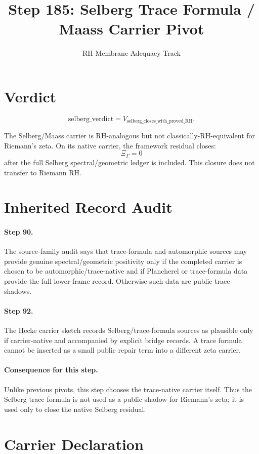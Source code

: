 \documentclass[11pt]{article}
\title{Step 185: Selberg Trace Formula / Maass Carrier Pivot}
\author{RH Membrane Adequacy Track}
\date{}
\newcommand{\XiGamma}{\Xi_{\Gamma}}
\begin{document}
\maketitle

\section*{Verdict}

\[
\boxed{\mathrm{selberg\_verdict}=V_{\mathrm{selberg\_closes\_with\_proved\_RH}}.}
\]

The Selberg/Maass carrier is RH-analogous but not classically-RH-equivalent
for Riemann's zeta.  On its native carrier, the framework residual closes:
\[
\boxed{\XiGamma=0}
\]
after the full Selberg spectral/geometric ledger is included.  This closure
does not transfer to Riemann RH.

\section*{Inherited Record Audit}

\paragraph{Step 90.}
The source-family audit says that trace-formula and automorphic sources may
provide genuine spectral/geometric positivity only if the completed carrier is
chosen to be automorphic/trace-native and if Plancherel or trace-formula data
provide the full lower-frame record.  Otherwise such data are public trace
shadows.

\paragraph{Step 92.}
The Hecke carrier sketch records Selberg/trace-formula sources as plausible
only if carrier-native and accompanied by explicit bridge records.  A trace
formula cannot be inserted as a small public repair term into a different
zeta carrier.

\paragraph{Consequence for this step.}
Unlike previous pivots, this step chooses the trace-native carrier itself.
Thus the Selberg trace formula is not used as a public shadow for Riemann's
zeta; it is used only to close the native Selberg residual.

\section*{Carrier Declaration}
\end{document}

